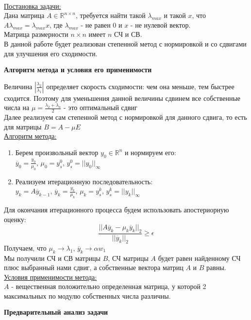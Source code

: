 \documentclass{article}
\begin{document}
	\\
	\underline{Постановка задачи:}\\
	Дана матрица $A \in \mathbb{R} ^{n \times n}$, требуется найти такой $\lambda_{max}$ и такой $x$, что $A\lambda_{max} = \lambda_{max}x$, где $\lambda_{max}$ - не равен 0 и $x$ - не нулевой вектор.\\
	Матрица размерности $n \times n$ имеет $n$ СЧ и СВ.\\
	В данной работе будет реализован степенной метод с нормировкой и со сдвигами для улучшения его сходимости.
	\begin{center} \textbf{Алгоритм метода и условия его применимости}\end{center}
	Величина $|\frac{\lambda_2}{\lambda_1}|$ определяет скорость сходимости: чем она меньше, тем быстрее сходится. Поэтому для уменьшения данной величины сдвинем все собственные числа на $\mu = \frac{\lambda_2 + \lambda_n}{2}$ - это оптимальный сдвиг\\
	Далее реализуем сам степенной метод с нормировкой для данного сдвига, то есть для матрицы $B = A - \mu E$\\
	\underline{Алгоритм метода:}\\
	\begin{enumerate}
		\item Берем произвольный вектор $y_0 \in \mathbb{R}^n$ и нормируем его:\\
		$\overline{y}_0 = \frac{y_0}{\mu_0}$, $\mu_0 = y^0_s$, $y^0_s = ||y_0||_{\infty}$
		\item Реализуем итерационную последовательность:\\
		$y_k = A\overline{y}_{k-1}$, $\overline{y}_k = \frac{y_k}{\mu_k}$, $\mu_k = y^k_s$, $y^k_s = ||y_k||_{\infty}$
	\end{enumerate}
	Для окончания итерационного процесса будем использовать апостериорную оценку:
	$$\frac{||A\overline{y}_k - \mu_k \overline{y}_k||_2}{||\overline{y}_k||_2} \geq \epsilon$$
	Получаем, что $\mu_k \rightarrow \lambda_1$, $\overline{y}_k \rightarrow \alpha w_1$\\
	Мы получили СЧ и СВ матрицы $B$, СЧ матрицы $A$ будет равен найденному СЧ плюс выбранный нами сдвиг, а собственные вектора матриц $A$ и $B$ равны.
	\underline{Условия применимости метода:}\\
	$A$ - вещественная положительно определенная матрица, у которой 2 максимальных по модулю собственных числа различны.
	\begin{center} \textbf{Предварительный анализ задачи}\end{center}
\end{document}
